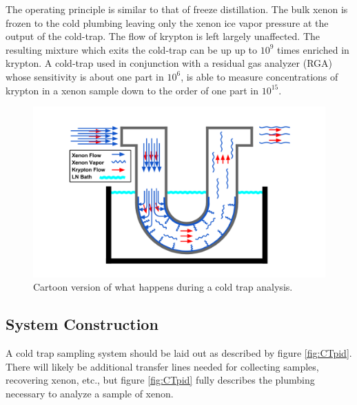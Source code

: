The operating principle is similar to that of freeze distillation. The bulk xenon is frozen to the cold plumbing leaving only the xenon ice vapor pressure at the output of the cold-trap. The flow of krypton is left largely unaffected. The resulting mixture which exits the cold-trap can be up up to $10^9$ times enriched in krypton. A cold-trap used in conjunction with a residual gas analyzer (RGA) whose sensitivity is about one part in $10^6$, is able to measure concentrations of krypton in a xenon sample down to the order of one part in $10^{15}$.
\begin{figure}[h]
  \includegraphics[width=\linewidth]{Figures/Cold_Trap_cartoon.png}
  \caption{Cartoon version of what happens during a cold trap analysis. }
  \label{fig:CTcartoon}
\end{figure}

\subsection{System Construction}
A cold trap sampling system should be laid out as described by figure \ref{fig:CTpid}. There will likely be additional transfer lines needed for collecting samples, recovering xenon, etc., but figure \ref{fig:CTpid} fully describes the plumbing necessary to analyze a sample of xenon.

